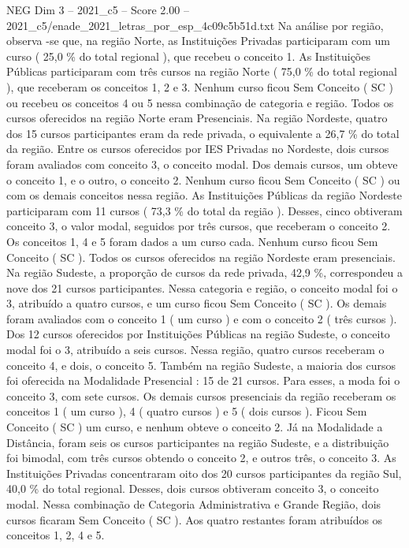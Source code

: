 \begin{textsample}{NEG Dim 3 – 2021\_c5 – Score 2.00 – 2021\_c5/enade\_2021\_letras\_por\_esp\_4c09c5b51d.txt}
Na análise por região, observa -se que, na região Norte, as Instituições Privadas participaram com um curso ( 25,0 \% do total regional ), que recebeu o conceito 1.
As Instituições Públicas participaram com três cursos na região Norte ( 75,0 \% do total regional ), que receberam os conceitos 1, 2 e 3.
Nenhum curso ficou Sem Conceito ( SC ) ou recebeu os conceitos 4 ou 5 nessa combinação de categoria e região.
Todos os cursos oferecidos na região Norte eram Presenciais.
Na região Nordeste, quatro dos 15 cursos participantes eram da rede privada, o equivalente a 26,7 \% do total da região.
Entre os cursos oferecidos por IES Privadas no Nordeste, dois cursos foram avaliados com conceito 3, o conceito modal.
Dos demais cursos, um obteve o conceito 1, e o outro, o conceito 2.
Nenhum curso ficou Sem Conceito ( SC ) ou com os demais conceitos nessa região.
As Instituições Públicas da região Nordeste participaram com 11 cursos ( 73,3 \% do total da região ).
Desses, cinco obtiveram conceito 3, o valor modal, seguidos por três cursos, que receberam o conceito 2.
Os conceitos 1, 4 e 5 foram dados a um curso cada.
Nenhum curso ficou Sem Conceito ( SC ).
Todos os cursos oferecidos na região Nordeste eram presenciais.
Na região Sudeste, a proporção de cursos da rede privada, 42,9 \%, correspondeu a nove dos 21 cursos participantes.
Nessa categoria e região, o conceito modal foi o 3, atribuído a quatro cursos, e um curso ficou Sem Conceito ( SC ).
Os demais foram avaliados com o conceito 1 ( um curso ) e com o conceito 2 ( três cursos ).
Dos 12 cursos oferecidos por Instituições Públicas na região Sudeste, o conceito modal foi o 3, atribuído a seis cursos.
Nessa região, quatro cursos receberam o conceito 4, e dois, o conceito 5.
Também na região Sudeste, a maioria dos cursos foi oferecida na Modalidade Presencial : 15 de 21 cursos.
Para esses, a moda foi o conceito 3, com sete cursos.
Os demais cursos presenciais da região receberam os conceitos 1 ( um curso ), 4 ( quatro cursos ) e 5 ( dois cursos ).
Ficou Sem Conceito ( SC ) um curso, e nenhum obteve o conceito 2.
Já na Modalidade a Distância, foram seis os cursos participantes na região Sudeste, e a distribuição foi bimodal, com três cursos obtendo o conceito 2, e outros três, o conceito 3.
As Instituições Privadas concentraram oito dos 20 cursos participantes da região Sul, 40,0 \% do total regional.
Desses, dois cursos obtiveram conceito 3, o conceito modal.
Nessa combinação de Categoria Administrativa e Grande Região, dois cursos ficaram Sem Conceito ( SC ).
Aos quatro restantes foram atribuídos os conceitos 1, 2, 4 e 5.

\end{textsample}
